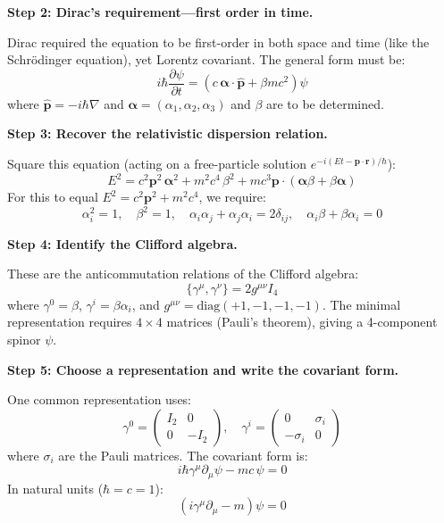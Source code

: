 \textbf{Step 2: Dirac's requirement---first order in time.}

Dirac required the equation to be first-order in both space and time (like the Schr\"odinger equation), yet Lorentz covariant. The general form must be:
\begin{equation}
i\hbar\frac{\partial \psi}{\partial t} = \left(c\,\boldsymbol{\alpha} \cdot \hat{\mathbf{p}} + \beta m c^2\right)\psi
\end{equation}
where $\hat{\mathbf{p}} = -i\hbar\nabla$ and $\boldsymbol{\alpha} = (\alpha_1, \alpha_2, \alpha_3)$ and $\beta$ are to be determined.

\textbf{Step 3: Recover the relativistic dispersion relation.}

Square this equation (acting on a free-particle solution $e^{-i(Et - \mathbf{p}\cdot\mathbf{r})/\hbar}$):
\begin{equation}
E^2 = c^2\mathbf{p}^2\,\boldsymbol{\alpha}^2 + m^2c^4\,\beta^2 + mc^3\mathbf{p}\cdot(\boldsymbol{\alpha}\beta + \beta\boldsymbol{\alpha})
\end{equation}
For this to equal $E^2 = c^2\mathbf{p}^2 + m^2c^4$, we require:
\begin{equation}
\alpha_i^2 = 1,\quad \beta^2 = 1,\quad \alpha_i\alpha_j + \alpha_j\alpha_i = 2\delta_{ij},\quad \alpha_i\beta + \beta\alpha_i = 0
\end{equation}

\textbf{Step 4: Identify the Clifford algebra.}

These are the anticommutation relations of the Clifford algebra:
\begin{equation}
\{\gamma^\mu, \gamma^\nu\} = 2g^{\mu\nu}I_4
\end{equation}
where $\gamma^0 = \beta$, $\gamma^i = \beta\alpha_i$, and $g^{\mu\nu} = \text{diag}(+1,-1,-1,-1)$. The minimal representation requires $4\times 4$ matrices (Pauli's theorem), giving a 4-component spinor $\psi$.

\textbf{Step 5: Choose a representation and write the covariant form.}

One common representation uses:
\begin{equation}
\gamma^0 = \begin{pmatrix} I_2 & 0 \\ 0 & -I_2 \end{pmatrix}, \quad \gamma^i = \begin{pmatrix} 0 & \sigma_i \\ -\sigma_i & 0 \end{pmatrix}
\end{equation}
where $\sigma_i$ are the Pauli matrices. The covariant form is:
\begin{equation}
i\hbar\gamma^\mu\partial_\mu\psi - mc\,\psi = 0
\end{equation}
In natural units ($\hbar = c = 1$):
\begin{equation}
\boxed{(i\gamma^\mu\partial_\mu - m)\psi = 0}
\end{equation}

